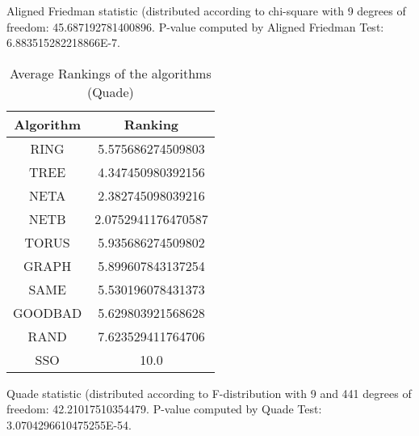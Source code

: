 \documentclass[a4paper,10pt]{article}
\begin{document}
\begin{landscape}
Aligned Friedman statistic (distributed according to chi-square with 9 degrees of freedom: 45.687192781400896. 
P-value computed by Aligned Friedman Test: 6.883515282218866E-7.\newline


\newpage

\begin{table}[!htp]
\centering
\caption{Average Rankings of the algorithms (Quade)
}\begin{tabular}{c|c}
Algorithm&Ranking\\
\hline
 RING&5.575686274509803\\
 TREE&4.347450980392156\\
 NETA&2.382745098039216\\
 NETB&2.0752941176470587\\
 TORUS&5.935686274509802\\
 GRAPH&5.899607843137254\\
 SAME&5.530196078431373\\
 GOODBAD&5.629803921568628\\
 RAND&7.623529411764706\\
 SSO&10.0\\
\end{tabular}
\end{table}
Quade statistic (distributed according to F-distribution with 9 and 441 degrees of freedom: 42.21017510354479. 
P-value computed by Quade Test: 3.0704296610475255E-54.\newline


\newpage


\end{landscape}
\end{document}

